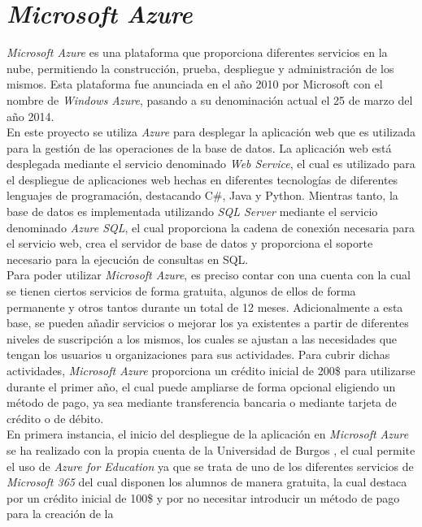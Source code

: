 \section{\textit{Microsoft Azure}}
 \textit{Microsoft Azure} es una plataforma que proporciona diferentes servicios
 en la nube, permitiendo la construcción, prueba, despliegue y administración de
 los mismos. Esta plataforma fue anunciada en el año 2010 por Microsoft con el
 nombre de \textit{Windows Azure}, pasando a su denominación actual el 25 de
 marzo del año 2014.
\\
En este proyecto se utiliza \textit{Azure} para desplegar la aplicación web que
es utilizada para la gestión de las operaciones de la base de datos. La
aplicación web está desplegada mediante el servicio denominado \textit{Web
Service}, el cual es utilizado para el despliegue de aplicaciones web hechas en
diferentes tecnologías de diferentes lenguajes de programación, destacando C\#,
Java y Python. Mientras tanto, la base de datos es implementada utilizando
\textit{SQL Server} mediante el servicio denominado \textit{Azure SQL}, el cual
proporciona la cadena de conexión necesaria para el servicio web, crea el
servidor de base de datos y proporciona el soporte necesario para la ejecución
de consultas en SQL.
\\
Para poder utilizar \textit{Microsoft Azure}\cite{azureMainPage}, es preciso contar con una cuenta
con la cual se tienen ciertos servicios de forma gratuita, algunos de ellos de forma
permanente y otros tantos durante un total de 12 meses. Adicionalmente a esta base, se pueden
añadir servicios o mejorar los ya existentes a partir de diferentes niveles de
suscripción a los mismos, los cuales se ajustan a las necesidades que tengan los
usuarios u organizaciones para sus actividades. Para cubrir dichas actividades,
\textit{Microsoft Azure} proporciona un crédito inicial de 200\$ para utilizarse
durante el primer año, el cual puede ampliarse de forma opcional eligiendo un
método de pago, ya sea mediante transferencia bancaria o mediante tarjeta de
crédito o de débito.
\\
En primera instancia, el inicio del despliegue de la aplicación en
\textit{Microsoft Azure} se ha realizado con la propia cuenta de la Universidad
de Burgos \cite{azureUBU}, el cual permite el uso
de \textit{Azure for Education} \cite{azureEDU} ya que se
trata de uno de los diferentes servicios de \textit{Microsoft 365} del cual
disponen los alumnos de manera gratuita, la cual destaca por un crédito inicial
de 100\$ y por no necesitar introducir un método de pago para la creación de la

